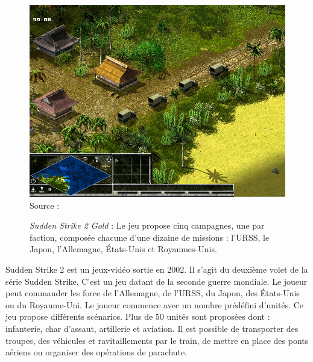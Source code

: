\begin{figure}[H]
    \centering
    \includegraphics[scale=0.3]{data/sudden_strike_2.jpg}\\
    Source : 
    \caption{\textit{Sudden Strike 2 Gold} : Le jeu propose cinq campagnes, une par faction, composée chacune d’une dizaine de missions : l'URSS, le Japon, l'Allemagne, États-Unis et Royaumes-Unis.}
\end{figure}

Sudden Strike 2 est un jeux-vidéo sortie en 2002. Il s'agit du deuxième volet de la série Sudden Strike. C'est un jeu datant de la seconde guerre mondiale.
Le joueur peut commander les force de l’Allemagne, de l’URSS, du Japon, des États-Unis ou du Royaume-Uni.
Le joueur commence avec un nombre prédéfini d'unités. Ce jeu propose différents scénarios. Plus de 50 unités sont proposées dont : infanterie, char d'assaut, artillerie et aviation.
Il est possible de transporter des troupes, des véhicules et ravitaillements par le train, de mettre en place des ponts aériens ou organiser des opérations de parachute.


